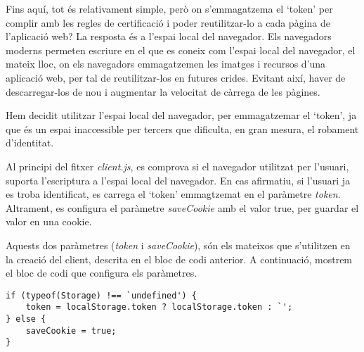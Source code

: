 Fins aquí, tot és relativament simple, però on s'emmagatzema el `token' per complir amb les regles de certificació i poder reutilitzar-lo a cada pàgina de l'aplicació web? La resposta és a l'espai local del navegador. Els navegadors moderns permeten escriure en el que es coneix com l'espai local del navegador, el mateix lloc, on els navegadors emmagatzemen les imatges i recursos d'una aplicació web, per tal de reutilitzar-los en futures crides. Evitant així, haver de descarregar-los de nou i augmentar la velocitat de càrrega de les pàgines.

Hem decidit utilitzar l'espai local del navegador, per emmagatzemar el `token', ja que és un espai inaccessible per tercers que dificulta, en gran mesura, el robament d'identitat.

Al principi del fitxer \emph{client.js}, es comprova si el navegador utilitzat per l'usuari, suporta l'escriptura a l'espai local del navegador. En cas afirmatiu, si l'usuari ja es troba identificat, es carrega el `token' emmagtzemat en el paràmetre \emph{token}. Altrament, es configura el paràmetre \emph{saveCookie} amb el valor true, per guardar el valor en una cookie.

Aquests dos paràmetres (\emph{token} i \emph{saveCookie}), són els mateixos que s'utilitzen en la creació del client, descrita en el bloc de codi anterior. A continuació, mostrem el bloc de codi que configura els paràmetres.

\begin{lstlisting}[style=rawOwn,caption={Configuració dels paràmetres \emph{access\_test\_token} i \emph{token}}]
if (typeof(Storage) !== `undefined') {
    token = localStorage.token ? localStorage.token : `';
} else {
    saveCookie = true;
}
\end{lstlisting}
